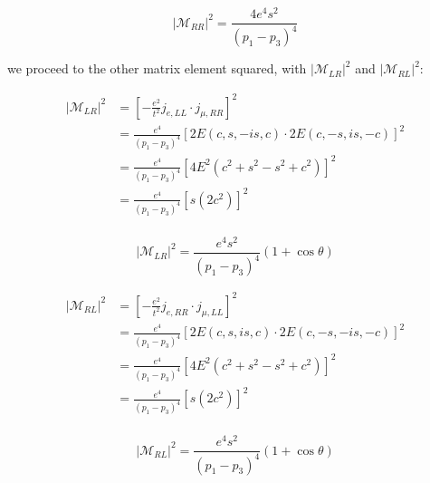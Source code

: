 \documentclass[11pt]{article}
\theoremstyle{definition}
\begin{document}
\begin{equation}
    \boxed{
        |\mathcal{M}_{RR}|^2
        =
        \frac{4e^4s^2}{(p_1-p_3)^4}
    }
\end{equation}


we proceed to the other matrix element squared, with $|\mathcal{M}_{LR}|^2$ and $|\mathcal{M}_{RL}|^2$:

\begin{align}
    |\mathcal{M}_{LR}|^2 &= \left[-\frac{e^2}{t^2}j_{e,LL} \cdot j_{\mu,RR}\right]^2\\
    &= \frac{e^4}{(p_1-p_3)^4} \left[ 2E(c, s, -is, c) \cdot 2E(c, -s, is, -c) \right]^2\\
    &= \frac{e^4}{(p_1-p_3)^4} \left[ 4E^2 (c^2 + s^2 - s^2 +c^2) \right]^2\\
    &= \frac{e^4}{(p_1-p_3)^4} \left[ s (2c^2) \right]^2 \\
\end{align}


\begin{equation}
\boxed{
    |\mathcal{M}_{LR}|^2
    =
    \frac{e^4s^2}{(p_1-p_3)^4}
    (1+\cos\theta)
}
\end{equation}

\begin{align}
    |\mathcal{M}_{RL}|^2 &= \left[-\frac{e^2}{t^2}j_{e,RR} \cdot j_{\mu,LL}\right]^2\\
    &= \frac{e^4}{(p_1-p_3)^4} \left[ 2E(c, s, is, c) \cdot 2E(c, -s, -is, -c) \right]^2\\
    &= \frac{e^4}{(p_1-p_3)^4} \left[ 4E^2 (c^2 + s^2 - s^2 +c^2) \right]^2\\
    &= \frac{e^4}{(p_1-p_3)^4} \left[ s (2c^2) \right]^2 \\
\end{align}

\begin{equation}
\boxed{
    |\mathcal{M}_{RL}|^2
    =
    \frac{e^4s^2}{(p_1-p_3)^4}
    (1+\cos\theta)
}
\end{equation}



\end{document}
